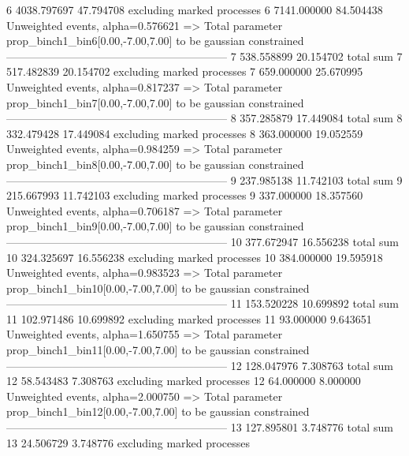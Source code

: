 6          4038.797697     47.794708       excluding marked processes    
6          7141.000000     84.504438       Unweighted events, alpha=0.576621
  => Total parameter prop_binch1_bin6[0.00,-7.00,7.00] to be gaussian constrained
------------------------------------------------------------
7          538.558899      20.154702       total sum                     
7          517.482839      20.154702       excluding marked processes    
7          659.000000      25.670995       Unweighted events, alpha=0.817237
  => Total parameter prop_binch1_bin7[0.00,-7.00,7.00] to be gaussian constrained
------------------------------------------------------------
8          357.285879      17.449084       total sum                     
8          332.479428      17.449084       excluding marked processes    
8          363.000000      19.052559       Unweighted events, alpha=0.984259
  => Total parameter prop_binch1_bin8[0.00,-7.00,7.00] to be gaussian constrained
------------------------------------------------------------
9          237.985138      11.742103       total sum                     
9          215.667993      11.742103       excluding marked processes    
9          337.000000      18.357560       Unweighted events, alpha=0.706187
  => Total parameter prop_binch1_bin9[0.00,-7.00,7.00] to be gaussian constrained
------------------------------------------------------------
10         377.672947      16.556238       total sum                     
10         324.325697      16.556238       excluding marked processes    
10         384.000000      19.595918       Unweighted events, alpha=0.983523
  => Total parameter prop_binch1_bin10[0.00,-7.00,7.00] to be gaussian constrained
------------------------------------------------------------
11         153.520228      10.699892       total sum                     
11         102.971486      10.699892       excluding marked processes    
11         93.000000       9.643651        Unweighted events, alpha=1.650755
  => Total parameter prop_binch1_bin11[0.00,-7.00,7.00] to be gaussian constrained
------------------------------------------------------------
12         128.047976      7.308763        total sum                     
12         58.543483       7.308763        excluding marked processes    
12         64.000000       8.000000        Unweighted events, alpha=2.000750
  => Total parameter prop_binch1_bin12[0.00,-7.00,7.00] to be gaussian constrained
------------------------------------------------------------
13         127.895801      3.748776        total sum                     
13         24.506729       3.748776        excluding marked processes    
